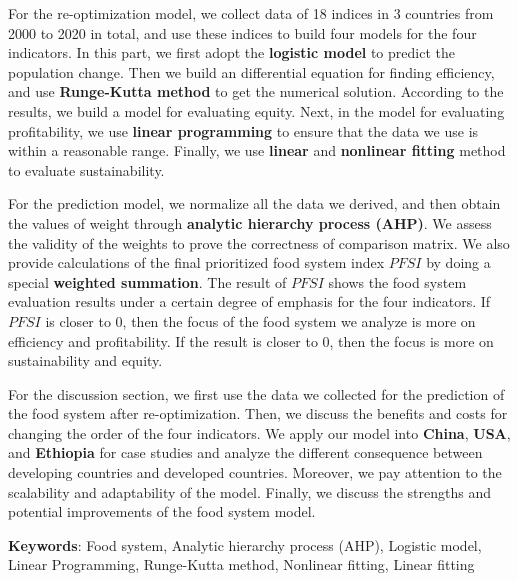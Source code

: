 \documentclass[12pt]{article}
\begin{document}
For the re-optimization model, we collect data of 18 indices in 3 countries from 2000 to 2020 in total, and use these indices to build four models for the four indicators. In this part, we first adopt the \textbf{logistic model} to predict the population change. Then we build an differential equation for finding efficiency, and use \textbf{Runge-Kutta method} to get the numerical solution. According to the results, we build a model for evaluating equity. Next, in the model for evaluating profitability, we use \textbf{linear programming} to ensure that the data we use is within a reasonable range. Finally, we use \textbf{linear} and \textbf{nonlinear fitting} method to evaluate sustainability. 

For the prediction model, we normalize all the data we derived, and then obtain the values of weight through \textbf{analytic hierarchy process (AHP)}. We assess the validity of the weights to prove the correctness of comparison matrix. We also provide calculations of the final prioritized food system index $PFSI$ by doing a special \textbf{weighted summation}. The result of $PFSI$ shows the food system evaluation results under a certain degree of emphasis for the four indicators. If $PFSI$ is closer to 0, then the focus of the food system we analyze is more on efficiency and profitability. If the result is closer to 0, then the focus is more on sustainability and equity.

For the discussion section, we first use the data we collected for the prediction of the food system after re-optimization. Then, we discuss the benefits and costs for changing the order of the four indicators. We apply our model into \textbf{China}, \textbf{USA}, and \textbf{Ethiopia} for case studies and analyze the different consequence between developing countries and developed countries. Moreover, we pay attention to the scalability and adaptability of the model. Finally, we discuss the strengths and potential improvements of the food system model.



\vspace{2em}
\textbf{Keywords}: Food system, Analytic hierarchy process (AHP), Logistic model, Linear Programming, Runge-Kutta method, Nonlinear fitting, Linear fitting


\clearpage
\pagestyle{fancy}
\end{document}
